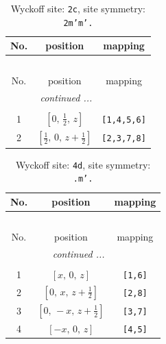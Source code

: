 \documentclass[fleqn,8pt]{jsarticle}
\begin{document}
\renewcommand{\arraystretch}{1.2}
\begin{longtable}{ccc}
\caption{Wyckoff site: {\tt 2c}, site symmetry: {\tt 2m'm'.}}
 \\
 \hline \hline
No. & position & mapping \\ \hline \endfirsthead

\multicolumn{2}{l}{\tablename\ \thetable{}} \\
 \hline \hline
No. & position & mapping \\ \hline \endhead

 \hline \hline
\multicolumn{2}{r}{\footnotesize\it continued ...} \\ \endfoot

 \hline \hline
\multicolumn{2}{r}{} \\ \endlastfoot

1 & $\left[ 0,\, \frac{1}{2},\, z \right]$ & {\tt [1,4,5,6]} \\ \hline
2 & $\left[ \frac{1}{2},\, 0,\, z + \frac{1}{2} \right]$ & {\tt [2,3,7,8]} \\
\end{longtable}
\renewcommand{\arraystretch}{1.2}
\begin{longtable}{ccc}
\caption{Wyckoff site: {\tt 4d}, site symmetry: {\tt .m'.}}
 \\
 \hline \hline
No. & position & mapping \\ \hline \endfirsthead

\multicolumn{2}{l}{\tablename\ \thetable{}} \\
 \hline \hline
No. & position & mapping \\ \hline \endhead

 \hline \hline
\multicolumn{2}{r}{\footnotesize\it continued ...} \\ \endfoot

 \hline \hline
\multicolumn{2}{r}{} \\ \endlastfoot

1 & $\left[ x,\, 0,\, z \right]$ & {\tt [1,6]} \\ \hline
2 & $\left[ 0,\, x,\, z + \frac{1}{2} \right]$ & {\tt [2,8]} \\ \hline
3 & $\left[ 0,\, - x,\, z + \frac{1}{2} \right]$ & {\tt [3,7]} \\ \hline
4 & $\left[ - x,\, 0,\, z \right]$ & {\tt [4,5]} \\
\end{longtable}
\renewcommand{\arraystretch}{1.2}
\end{document}
